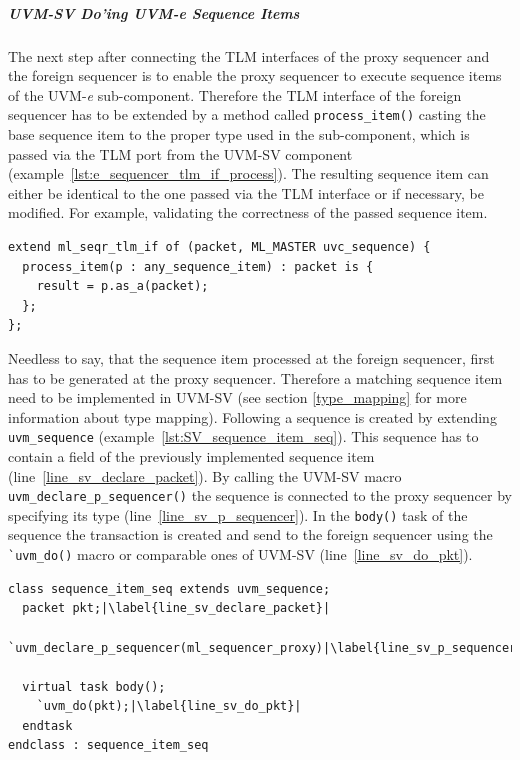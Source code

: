 \subparagraph{UVM-SV Do'ing UVM-\textit{e} Sequence Items}
\lstset{language=e, numbers = left, escapechar=|, breaklines=true}
The next step after connecting the TLM interfaces of the proxy sequencer and the foreign sequencer is to enable the proxy sequencer to execute sequence items of the UVM-\textit{e} sub-component. Therefore the TLM interface of the foreign sequencer has to be extended by a method called \lstinline$process_item()$ casting the  base sequence item to the proper type used in the sub-component, which is passed via the TLM port from the UVM-SV component (example~\ref{lst:e_sequencer_tlm_if_process}). The resulting sequence item can either be identical to the one passed via the TLM interface or if necessary, be modified. For example, validating the correctness of the passed sequence item.
\lstset{language=e, numbers = left, escapechar=|, breaklines=true}
\begin{lstlisting}[frame=htrbl, caption={\textit{e}: processing the sequence item send from the UVM-SV component},
label={lst:e_sequencer_tlm_if_process}]
extend ml_seqr_tlm_if of (packet, ML_MASTER uvc_sequence) {
  process_item(p : any_sequence_item) : packet is {
    result = p.as_a(packet);
  };
};
\end{lstlisting}
Needless to say, that the sequence item processed at the foreign sequencer, first has to be generated at the proxy sequencer. Therefore a matching sequence item need to be implemented in UVM-SV (see section \ref{type_mapping} for more information about type mapping). Following a sequence is created by extending \lstinline$uvm_sequence$ (example~\ref{lst:SV_sequence_item_seq}). This sequence has to contain a field of the previously implemented sequence item (line~\ref{line_sv_declare_packet}). By calling the UVM-SV macro \lstinline$uvm_declare_p_sequencer()$ the sequence is connected to the proxy sequencer by specifying its type (line~\ref{line_sv_p_sequencer}). In the \lstinline$body()$ task of the sequence the transaction is created and send to the foreign sequencer using the \lstinline$`uvm_do()$ macro or comparable ones of UVM-SV (line~\ref{line_sv_do_pkt}).
\lstset{language=SystemVerilog, numbers = left, escapechar=|, breaklines=true}
\begin{lstlisting}[frame=htrbl, caption={SystemVerilog: sending an UVM-\textit{e} sequence item  from  an UVM-SV sequence},
label={lst:SV_sequence_item_seq}]
class sequence_item_seq extends uvm_sequence;
  packet pkt;|\label{line_sv_declare_packet}|
  `uvm_declare_p_sequencer(ml_sequencer_proxy)|\label{line_sv_p_sequencer}|

  virtual task body();
    `uvm_do(pkt);|\label{line_sv_do_pkt}|
  endtask  
endclass : sequence_item_seq
\end{lstlisting}
